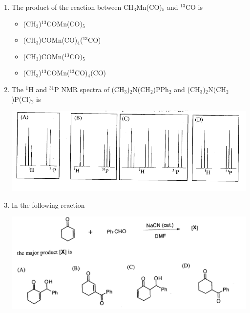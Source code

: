 \documentclass[journal,12pt,onecolumn]{IEEEtran}
\theoremstyle{remark}
\begin{document}
\begin{enumerate}
\item    \hspace{0.5cm} The product of the reaction between CH$_3$Mn(CO)$_5$ and $^{13}$CO is  \hfill{}

\begin{multicols}{2}
\begin{itemize}[label=(A)]
    \item (CH$_3$)$^{13}$COMn(CO)$_5$
    \item (CH$_3$)COMn(CO)$_4$($^{13}$CO)
    \item (CH$_3$)COMn($^{13}$CO)$_5$
    \item (CH$_3$)$^{13}$COMn($^{13}$CO)$_4$(CO)
\end{itemize}
\end{multicols}
 

\item    \hspace{0.5cm} The $^1$H and $^{31}$P NMR spectra of (CH$_3$)$_2$N(CH$_2$)PPh$_2$ and (CH$_3$)$_2$N(CH$_2$)P(Cl)$_2$ is  \hfill{}

\includegraphics[width=\linewidth]{figs/image11.png}
 

\item    \hspace{0.5cm} In the following reaction  \hfill{}

\begin{center}
\includegraphics[width=\textwidth]{figs/image12.png}
\end{center}


\end{enumerate}
\end{document}
